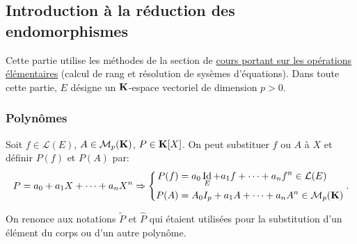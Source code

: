 \subsection{Introduction à la réduction des endomorphismes}
Cette partie utilise les méthodes de la section de \href{\baseurl C2234.pdf}{cours portant sur les opérations élémentaires} (calcul de rang et résolution de sysèmes d'équations).
Dans toute cette partie, $E$ désigne un $\mathbf{K}$-espace vectoriel de dimension $p > 0$.
\subsubsection{Polynômes}
\begin{defi}
  Soit $f\in \mathcal{L}(E)$, $A \in \mathcal{M}_p(\mathbf{K})$, $P\in \mathbf{K}[X]$. On peut substituer $f$ ou $A$ à $X$ et définir 
  $P(f)$ et $P(A)$ par:
\[
  P = a_0 + a_1X + \cdots +a_nX^n
  \Rightarrow
  \left\lbrace
  \begin{aligned}
    P(f) &= a_0 \mathop{\mathrm{Id}}_E + a_1 f + \cdots + a_n f^n \in \mathcal{L}(E) \\
    P(A) &= A_0 I_p + a_1 A + \cdots + a_n A^n \in \mathcal{M}_p(\mathbf{K})
  \end{aligned}
  \right. .
\]
\end{defi}
\begin{rem}
  On renonce aux notations $\widetilde{P}$ et $\widehat{P}$ qui étaient utilisées pour la substitution d'un élément du corps ou d'un autre polynôme.
\end{rem}

